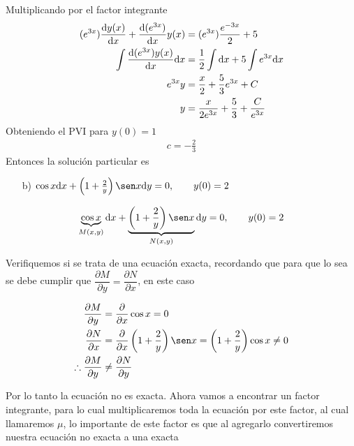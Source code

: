 Multiplicando por el factor integrante
\begin{align*}
    (e^{3x})\dv{y(x)}{x} + \dv{(e^{3x})}{x}y(x) &= (e^{3x}) \frac{e^{-3x}}{2} +5\\
     \int \dv{(e^{3x})y(x)}{x} \dd x &= \frac{1}{2} \int \dd x + 5 \int e^{3x}\dd x \\
     e^{3x} y & = \frac{x}{2}+\frac{5}{3}e^{3x}+C\\
     y & = \frac{x}{2e^{3x}}+\frac{5}{3}+\frac{C}{e^{3x}}\\
\end{align*}
Obteniendo el PVI para $y(0)=1$
\begin{align*}
    c = - \frac{2}{3}
\end{align*}
Entonces la solución particular es 
\begin{center}
\end{center}




\begin{itemize}
    \item[b)] $\cos x \dd x+ \left( 1 + \frac{2}{y} \right) \sen x \dd y=0, \qquad y(0)=2$
\end{itemize}
\begin{align*}
    \underbrace{\cos x}_{M\pr{x,y}} \dd x+\underbrace{ \left( 1 + \frac{2}{y} \right) \sen x }_{N\pr{x,y}}\dd y=0, \qquad y(0)=2
\end{align*}

Verifiquemos si se trata de una ecuación exacta, recordando que para que lo sea se debe cumplir que $\dfrac{\partial M}{\partial y}=\dfrac{\partial N}{\partial x}$, en este caso

\begin{align*}
    \dfrac{\partial M}{\partial y} &= \dfrac{\partial}{\partial x} \cos x = 0 \\
    \dfrac{\partial N}{\partial x}&=\dfrac{\partial}{\partial x}\left(1+\dfrac{2}{y}\right)\sen x = \left(1+\dfrac{2}{y}\right)\cos x  \neq 0 \\
    \therefore \dfrac{\partial M}{\partial y} &\neq \dfrac{\partial N}{\partial y}
\end{align*}
 
 Por lo tanto la ecuación no es exacta. Ahora vamos a encontrar un factor integrante, para lo cual multiplicaremos toda la ecuación por este factor, al cual llamaremos $\mu$, lo importante de este factor es que al agregarlo convertiremos nuestra ecuación no exacta a una exacta 
 
